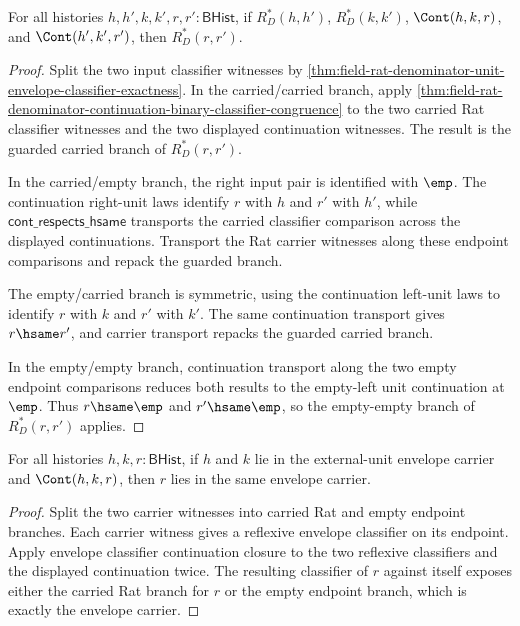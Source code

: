 \begin{theorem}
\label{thm:field-rat-denominator-unit-envelope-continuation-closure}
For all histories $h,h',k,k',r,r':\mathsf{BHist}$, if
$R_D^\ast(h,h')$, $R_D^\ast(k,k')$, $\Cont(h,k,r)$, and
$\Cont(h',k',r')$, then $R_D^\ast(r,r')$.
\end{theorem}
\begin{proof}
Split the two input classifier witnesses by
\autoref{thm:field-rat-denominator-unit-envelope-classifier-exactness}. In the
carried/carried branch, apply
\autoref{thm:field-rat-denominator-continuation-binary-classifier-congruence}
to the two carried Rat classifier witnesses and the two displayed continuation
witnesses. The result is the guarded carried branch of $R_D^\ast(r,r')$.

In the carried/empty branch, the right input pair is identified with
$\emp$. The continuation right-unit laws identify $r$ with $h$ and $r'$ with
$h'$, while $\mathsf{cont\_respects\_hsame}$ transports the carried classifier
comparison across the displayed continuations. Transport the Rat carrier
witnesses along these endpoint comparisons and repack the guarded branch.

The empty/carried branch is symmetric, using the continuation left-unit laws to
identify $r$ with $k$ and $r'$ with $k'$. The same continuation transport gives
$r\hsame r'$, and carrier transport repacks the guarded carried branch.

In the empty/empty branch, continuation transport along the two empty endpoint
comparisons reduces both results to the empty-left unit continuation at
$\emp$. Thus $r\hsame\emp$ and $r'\hsame\emp$, so the empty-empty branch of
$R_D^\ast(r,r')$ applies.
\end{proof}

\begin{theorem}
\label{thm:field-rat-denominator-unit-envelope-carrier-continuation-closed}
For all histories $h,k,r:\mathsf{BHist}$, if $h$ and $k$ lie in the
external-unit envelope carrier and $\Cont(h,k,r)$, then $r$ lies in the same
envelope carrier.
\end{theorem}
\begin{proof}
Split the two carrier witnesses into carried Rat and empty endpoint branches.
Each carrier witness gives a reflexive envelope classifier on its endpoint.
Apply envelope classifier continuation closure to the two reflexive
classifiers and the displayed continuation twice. The resulting classifier of
$r$ against itself exposes either the carried Rat branch for $r$ or the empty
endpoint branch, which is exactly the envelope carrier.
\end{proof}

